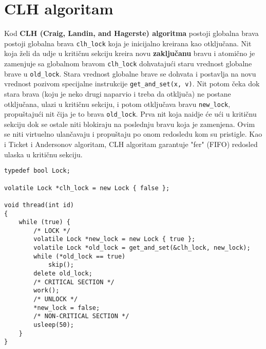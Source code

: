 \clearpage
\section{CLH algoritam}
Kod \textbf{CLH (Craig, Landin, and Hagerste) algoritma} postoji globalna brava postoji globalna brava \texttt{clh\_lock} koja je inicijalno kreirana kao otklju\v{c}ana. Nit koja \v{z}eli da udje u kriti\v{c}nu sekciju kreira novu \textbf{zaklju\v{c}anu} bravu i atomi\v{c}no je zamenjuje sa globalnom bravom \texttt{clh\_lock} dohvataju\'{c}i staru vrednost globalne brave u \texttt{old\_lock}. Stara vrednost globalne brave se dohvata i postavlja na novu vrednost pozivom specijalne instrukcije \texttt{get\_and\_set(x, v)}. Nit potom \v{c}eka dok stara brava (koju je neko drugi naparvio i treba da otklju\v{c}a) ne postane otklju\v{c}ana, ulazi u kriti\v{c}nu sekciju, i potom otklju\v{c}ava bravu \texttt{new\_lock}, propu\v{s}taju\'{c}i nit \v{c}ija je to brava \texttt{old\_lock}. Prva nit koja naidje \'{c}e u\'{c}i u kriti\v{c}nu sekciju dok se ostale niti blokiraju na poslednju bravu koja je zamenjena. Ovim se niti virtuelno ulan\v{c}avaju i propu\v{s}taju po onom redosledu kom su pristigle. Kao i Ticket i Andersonov algoritam, CLH algoritam garantuje "fer" (FIFO) redosled ulaska u kriti\v{c}nu sekciju.

\begin{lstlisting}
typedef bool Lock;

volatile Lock *clh_lock = new Lock { false };

void thread(int id)
{
    while (true) {
        /* LOCK */
        volatile Lock *new_lock = new Lock { true };
        volatile Lock *old_lock = get_and_set(&clh_lock, new_lock);
        while (*old_lock == true)
            skip();
        delete old_lock;
        /* CRITICAL SECTION */
        work();
        /* UNLOCK */
        *new_lock = false;
        /* NON-CRITICAL SECTION */
        usleep(50);
    }
}
\end{lstlisting}